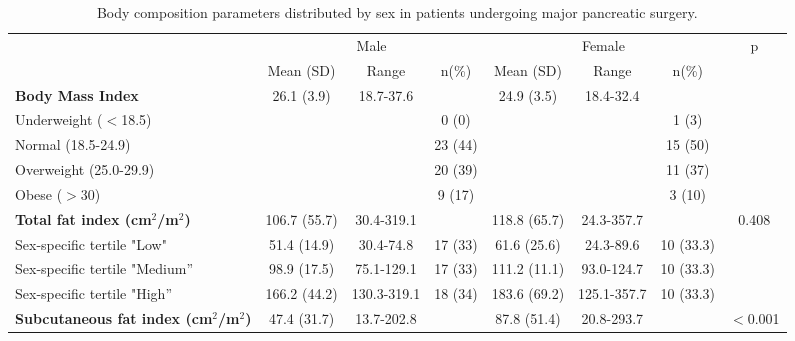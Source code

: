 \begin{sidewaystable}[p]
 \caption{Body composition parameters distributed by sex in patients undergoing major pancreatic surgery.}
 \label{table:bc_sex_specific_distrib}
 \renewcommand{\arraystretch}{1.2} %
 \centering
 \begin{tabular}{|l|c c c | c c c |c|}
 	\hline
 	                                                  &       \multicolumn{3}{c}{Male}       &       \multicolumn{3}{c}{Female}       & p        \\
 	                                                  &  Mean (SD)   & Range       & n(\%)   & Mean (SD)    & Range       & n(\%)     &  \\ \hline
 	\textbf{Body Mass Index}                          &  26.1 (3.9)  & 18.7-37.6   &         & 24.9 (3.5)   & 18.4-32.4   &           &  \\
 	Underweight ($<$18.5)                             &              &             & 0 (0)   &              &             & 1 (3)     &  \\
 	Normal (18.5-24.9)                                &              &             & 23 (44) &              &             & 15 (50)   &  \\
 	Overweight (25.0-29.9)                            &              &             & 20 (39) &              &             & 11 (37)   &  \\
 	Obese ($>$30)                                     &              &             & 9 (17)  &              &             & 3 (10)    &  \\ \hline
 	\textbf{Total fat index (cm$^2$/m$^2$)}           & 106.7 (55.7) & 30.4-319.1  &         & 118.8 (65.7) & 24.3-357.7  &           & 0.408    \\
 	Sex-specific tertile "Low"                        & 51.4 (14.9)  & 30.4-74.8   & 17 (33) & 61.6 (25.6)  & 24.3-89.6   & 10 (33.3) &  \\
 	Sex-specific tertile "Medium”                     & 98.9 (17.5)  & 75.1-129.1  & 17 (33) & 111.2 (11.1) & 93.0-124.7  & 10 (33.3) &  \\
 	Sex-specific tertile "High”                       & 166.2 (44.2) & 130.3-319.1 & 18 (34) & 183.6 (69.2) & 125.1-357.7 & 10 (33.3) &  \\ \hline
 	\textbf{Subcutaneous fat index (cm$^2$/m$^2$) }   & 47.4 (31.7)  & 13.7-202.8  &         & 87.8 (51.4)  & 20.8-293.7  &           & $<$0.001 \\

\end{tabular}
\end{sidewaystable}
